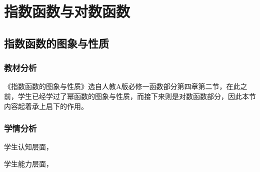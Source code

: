 \chapter{指数函数与对数函数}
\section{指数函数的图象与性质}
\subsection{教材分析}
《指数函数的图象与性质》选自人教A版必修一函数部分第四章第二节，在此之前，学生已经学过了幂函数的图象与性质，而接下来则是对数函数部分，因此本节内容起着承上启下的作用。
\subsection{学情分析}
学生认知层面，

学生能力层面，